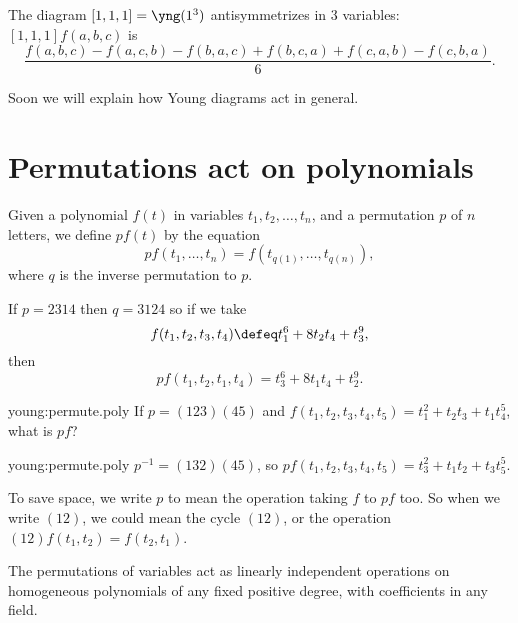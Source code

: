 \begin{example}
The diagram \([1,1,1]=\yng(1^3)\) antisymmetrizes in 3 variables: \([1,1,1]f(a,b,c)\) is
\[
\frac{f(a,b,c)-f(a,c,b)-f(b,a,c)+f(b,c,a)+f(c,a,b)-f(c,b,a)}{6}.
\]
\end{example}
Soon we will explain how Young diagrams act in general. 

\section{Permutations act on polynomials}
Given a polynomial \(f(t)\) in variables \(t_1,t_2,\dots,t_n\), and a permutation \(p\) of \(n\) letters, we define \(pf(t)\) by the equation
\[
pf(t_1,\dots,t_n)=f(t_{q(1)},\dots,t_{q(n)}),
\]
where \(q\) is the inverse permutation to \(p\).
\begin{example}
If \(p=2314\) then \(q=3124\) so if we take
\[
f(t_1,t_2,t_3,t_4)\defeq t_1^6+8t_2t_4+t_3^9,
\]
then
\[
pf(t_1,t_2,t_1,t_4)=t_3^6+8t_1t_4+t_2^9.
\]
\end{example}
\begin{problem}{young:permute.poly}
If \(p=(123)(45)\) and \(f(t_1,t_2,t_3,t_4,t_5)=t_1^2 + t_2t_3+t_1t_4^5\), what is \(pf\)?
\end{problem}
\begin{answer}{young:permute.poly}
\(p^{-1}=(132)(45)\), so \(pf(t_1,t_2,t_3,t_4,t_5)=t_3^2 + t_1t_2+t_3t_5^5\).
\end{answer}
To save space, we write \(p\) to mean the operation taking \(f\) to \(pf\) too.
So when we write \((12)\), we could mean the cycle \((12)\), or the operation \((12)f(t_1,t_2)=f(t_2,t_1)\).
\begin{lemma}\label{lemma:permutations.independent}
The permutations of variables act as linearly independent operations on homogeneous polynomials of any fixed positive degree, with coefficients in any field.
\end{lemma}
